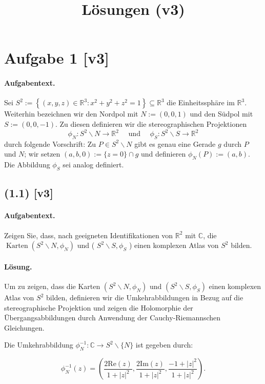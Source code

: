 \documentclass[11pt,a4paper]{article}
\title{Lösungen (v3)}
\date{}
\begin{document}
\maketitle

\section*{Aufgabe 1 [v3]}
\paragraph{Aufgabentext.}
Sei $S^2:=\left\{(x, y, z) \in \mathbb{R}^3: x^2+y^2+z^2=1\right\} \subseteq \mathbb{R}^3$ die Einheitssphäre im $\mathbb{R}^3$. Weiterhin bezeichnen wir den Nordpol mit $N:=(0,0,1)$ und den Südpol mit $S:=(0,0,-1)$. Zu diesen definieren wir die stereographischen Projektionen
$$
\phi_N: S^2 \backslash N \rightarrow \mathbb{R}^2 \quad \text { und } \quad \phi_S: S^2 \backslash S \rightarrow \mathbb{R}^2
$$
durch folgende Vorschrift: Zu $P \in S^2 \backslash N$ gibt es genau eine Gerade $g$ durch $P$ und $N$; wir setzen $(a, b, 0):=\{z=0\} \cap g$ und definieren $\phi_N(P):=(a, b)$. Die Abbildung $\phi_S$ sei analog definiert.

\subsection*{(1.1) [v3]}
\paragraph{Aufgabentext.}
Zeigen Sie, dass, nach geeigneten Identifikationen von $\mathbb{R}^2$ mit $\mathbb{C}$, die $\operatorname{Karten}\left(S^2 \backslash N, \phi_N\right)$ und ( $S^2 \backslash S, \phi_S$ ) einen komplexen Atlas von $S^2$ bilden.

\paragraph{Lösung.}
Um zu zeigen, dass die Karten $\left(S^2 \backslash N, \phi_N\right)$ und $\left(S^2 \backslash S, \phi_S\right)$ einen komplexen Atlas von $S^2$ bilden, definieren wir die Umkehrabbildungen in Bezug auf die stereographische Projektion und zeigen die Holomorphie der Übergangsabbildungen durch Anwendung der Cauchy-Riemannschen Gleichungen.

Die Umkehrabbildung $\phi_N^{-1}: \mathbb{C} \to S^2 \backslash \{N\}$ ist gegeben durch:

\[
\phi_N^{-1}(z) = \left( \frac{2\text{Re}(z)}{1 + |z|^2}, \frac{2\text{Im}(z)}{1 + |z|^2}, \frac{-1 + |z|^2}{1 + |z|^2} \right).
\]
\end{document}
